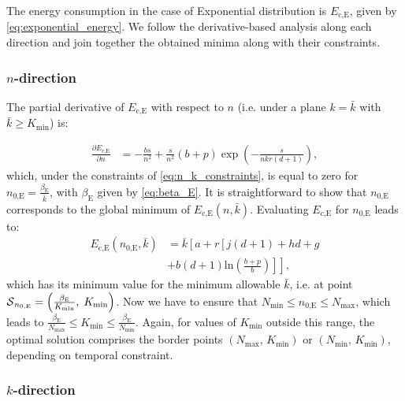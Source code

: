 \documentclass[twocolumn,english]{IEEEtran}
\theoremstyle{plain}
\theoremstyle{definition}
\begin{document}
The energy consumption in the case of Exponential distribution is
$E_{\text{c,E}}$, given by \eqref{eq:exponential_energy}. We follow
the derivative-based analysis along each direction and join together
the obtained minima along with their constraints.


\subsubsection{$n$-direction}

The partial derivative of $E_{\text{c,E}}$ with respect to $n$ (i.e.
under a plane $k=\bar{k}$ with $\bar{k}\geq K_{\min}$) is:

\begin{align}
\frac{\partial E_{\text{c},\text{E}}}{\partial n} & =-\frac{bs}{n^{2}}+\frac{s}{n^{2}}\left(b+p\right)\exp\left(-\frac{s}{nkr(d+1)}\right),
\end{align}
which, under the constraints of \ref{eq:n_k_constraints}, is equal
to zero for $n_{\text{0,E}}=\frac{\beta_{\text{E}}}{\bar{k}}$, with
$\beta_{\text{E}}$ given by \eqref{eq:beta_E}. It is straightforward
to show that $n_{\text{0,E}}$ corresponds to the global minimum of
$E_{\text{c,E}}\left(n,\bar{k}\right)$. Evaluating $E_{\text{c,E}}$
for $n_{\text{0,E}}$ leads to: 
\begin{align}
E_{\text{c,E}}(n_{\text{0,E}},\bar{k}) & =\bar{k}\left[a+r\left[j\left(d+1\right)+hd+g\right.\right.\nonumber \\
 & \left.\left.+b\left(d+1\right)\text{ln}\left(\frac{b+p}{b}\right)\right]\right],
\end{align}
which has its minimum value for the minimum allowable $\bar{k}$,
i.e. at point $\text{\ensuremath{\mathcal{S}}}_{n_{0,\text{E}}}=\left(\frac{\beta_{\text{E}}}{K_{\text{min}}},\; K_{\text{min}}\right)$.
Now we have to ensure that $N_{\text{min}}\le n_{\text{0,E}}\le N_{\text{max}}$,
which leads to $\frac{\beta_{\text{E}}}{N_{\text{max}}}\le K_{\text{min}}\le\frac{\beta_{\text{E}}}{N_{\text{min}}}$.
Again, for values of $K_{\text{min}}$ outside this range, the optimal
solution comprises the border points $\left(N_{\text{max}},\, K_{\text{min}}\right)$
or $\left(N_{\text{min}},\, K_{\text{min}}\right)$, depending on
temporal constraint.


\subsubsection{$k$-direction}
\end{document}
